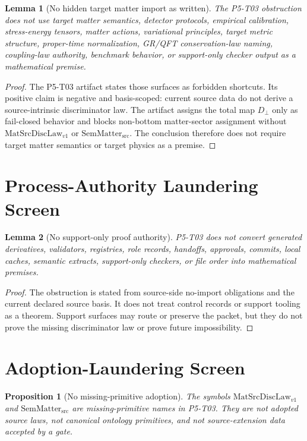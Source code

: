 \documentclass[11pt]{article}
\newcommand{\MatSrcDiscLaw}{\mathrm{MatSrcDiscLaw}_{v1}}
\newcommand{\SemMatterSrc}{\mathrm{SemMatter}_{\mathrm{src}}}
\newcommand{\Dbot}{D_{\bot}}
\newtheorem{lemma}{Lemma}
\newtheorem{proposition}{Proposition}
\begin{document}
\begin{lemma}[No hidden target matter import as written]
The P5-T03 obstruction does not use target matter semantics, detector
protocols, empirical calibration, stress-energy tensors, matter actions,
variational principles, target metric structure, proper-time normalization,
GR/QFT conservation-law naming, coupling-law authority, benchmark behavior, or
support-only checker output as a mathematical premise.
\end{lemma}

\begin{proof}
The P5-T03 artifact states those surfaces as forbidden shortcuts. Its positive
claim is negative and basis-scoped: current source data do not derive a
source-intrinsic discriminator law. The artifact assigns the total map
\(\Dbot\) only as fail-closed behavior and blocks non-bottom matter-sector
assignment without \(\MatSrcDiscLaw\) or \(\SemMatterSrc\). The conclusion
therefore does not require target matter semantics or target physics as a
premise.
\end{proof}

\section{Process-Authority Laundering Screen}

\begin{lemma}[No support-only proof authority]
P5-T03 does not convert generated derivatives, validators, registries, role
records, handoffs, approvals, commits, local caches, semantic extracts,
support-only checkers, or file order into mathematical premises.
\end{lemma}

\begin{proof}
The obstruction is stated from source-side no-import obligations and the
current declared source basis. It does not treat control records or support
tooling as a theorem. Support surfaces may route or preserve the packet, but
they do not prove the missing discriminator law or prove future impossibility.
\end{proof}

\section{Adoption-Laundering Screen}

\begin{proposition}[No missing-primitive adoption]
The symbols \(\MatSrcDiscLaw\) and \(\SemMatterSrc\) are missing-primitive
names in P5-T03. They are not adopted source laws, not canonical ontology
primitives, and not source-extension data accepted by a gate.
\end{proposition}
\end{document}
